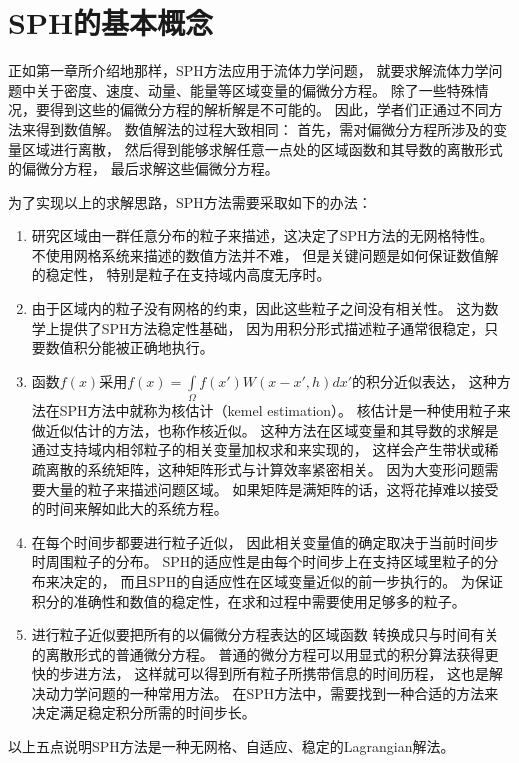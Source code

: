 \section{SPH的基本概念}
\label{sec:sph-base-conc}

正如第一章所介绍地那样，SPH方法应用于流体力学问题，
就要求解流体力学问题中关于密度、速度、动量、能量等区域变量的偏微分方程。
除了一些特殊情况，要得到这些的偏微分方程的解析解是不可能的。
因此，学者们正通过不同方法来得到数值解。
数值解法的过程大致相同：
首先，需对偏微分方程所涉及的变量区域进行离散，
然后得到能够求解任意一点处的区域函数和其导数的离散形式的偏微分方程，
最后求解这些偏微分方程。

为了实现以上的求解思路，SPH方法需要采取如下的办法：

\begin{enumerate}
\item 研究区域由一群任意分布的粒子来描述，这决定了SPH方法的无网格特性。
不使用网格系统来描述的数值方法并不难，
但是关键问题是如何保证数值解的稳定性，
特别是粒子在支持域内高度无序时。

\item 由于区域内的粒子没有网格的约束，因此这些粒子之间没有相关性。
这为数学上提供了SPH方法稳定性基础，
因为用积分形式描述粒子通常很稳定，只要数值积分能被正确地执行。

\item 函数$f(x)$采用$f(x)=\int\limits_\Omega{}f(x')W(x-x',h)dx'$的积分近似表达，
这种方法在SPH方法中就称为核估计（kemel estimation）。
核估计是一种使用粒子来做近似估计的方法，也称作核近似。
这种方法在区域变量和其导数的求解是通过支持域内相邻粒子的相关变量加权求和来实现的，
这样会产生带状或稀疏离散的系统矩阵，这种矩阵形式与计算效率紧密相关。
因为大变形问题需要大量的粒子来描述问题区域。
如果矩阵是满矩阵的话，这将花掉难以接受的时间来解如此大的系统方程。

\item 在每个时间步都要进行粒子近似，
因此相关变量值的确定取决于当前时间步时周围粒子的分布。
SPH的适应性是由每个时间步上在支持区域里粒子的分布来决定的，
而且SPH的自适应性在区域变量近似的前一步执行的。
为保证积分的准确性和数值的稳定性，在求和过程中需要使用足够多的粒子。

\item 进行粒子近似要把所有的以偏微分方程表达的区域函数
转换成只与时间有关的离散形式的普通微分方程。
普通的微分方程可以用显式的积分算法获得更快的步进方法，
这样就可以得到所有粒子所携带信息的时间历程，
这也是解决动力学问题的一种常用方法。
在SPH方法中，需要找到一种合适的方法来决定满足稳定积分所需的时间步长。

\end{enumerate}\qquad{}
以上五点说明SPH方法是一种无网格、自适应、稳定的Lagrangian解法。

